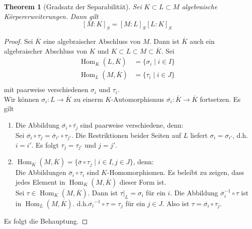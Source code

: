\documentclass[10pt,a4paper]{article}
\newcommand{\ol}[1]{\overline{#1}}
\newcommand{\Hom}{\operatorname{Hom}}
\theoremstyle{plain}
\newtheorem{theorem}{Theorem}[section]
\theoremstyle{definition}
\theoremstyle{remark}
\begin{document}
	\begin{theorem}[Gradsatz der Separabilität]
		Sei $K\subset L\subset M$ algebraische Körpererweiterungen. Dann gilt\[[M:K]_S=[M:L]_S[L:K]_S\]
	\end{theorem}
	\begin{proof}
		Sei $\ol K$ eine algebraischer Abschluss von $M$. Dann ist $\ol K$ auch ein algebraischer Abschluss von $K$ und $K\subset L\subset M\subset\ol K$. Sei
		\begin{align*}
		\Hom_K(L,\ol K)&=\{\sigma_i\mid i\in I\}\\
		\Hom_L(M,\ol K)&=\{\tau_i\mid i\in J\}\\
		\end{align*}
		mit paarweise verschiedenen $\sigma_i$ und $\tau_i$.\\
		Wir können $\sigma_i:L\to\ol K$ zu einerm $K$-Automorphismus $\ol{\sigma_i}:\ol K\to\ol K$ fortsetzen. Es gilt
		\begin{enumerate}
			\item Die Abbildung $\ol{\sigma_i}\circ\ol{\tau_j}$ sind paarweise verschiedene, denn:\\
			Sei $\ol{\sigma_i}\circ \tau_j=\ol{\sigma}_{i'}\circ\tau_{j'}$. Die Restriktionen beider Seiten auf $L$ liefert $\sigma_i=\sigma_{i'}$, d.h. $i=i'$. Es folgt $\tau_j=\tau_{j'}$ und $j=j'$.
			\item $\Hom_K(M,\ol K)=\{\ol{\sigma}\circ \tau_j\mid i\in I,j\in J\}$, denn:\\
			Die Abbildungen $\ol{\sigma}_i\circ \tau_i$ sind $K$-Homomorphismen. Es beleibt zu zeigen, dass jedes Element in $\Hom_K(M,\ol K)$ dieser Form ist.\\
			Sei $\tau\in\Hom_K(M,\ol K)$. Dann ist $\tau|_L=\sigma_i$ für ein $i$. Die Abbildung $\ol{\sigma}_i^{-1}\circ \tau$ ist in $\Hom_L(M,\ol K)$. d.h.$\ol{\sigma_i}^{-1}\circ\tau=\tau_j$ für ein $j\in J$. Also ist $\tau=\ol{\sigma_i}\circ\tau_j$.
		\end{enumerate}
	Es folgt die Behauptung.
	\end{proof}
\end{document}
